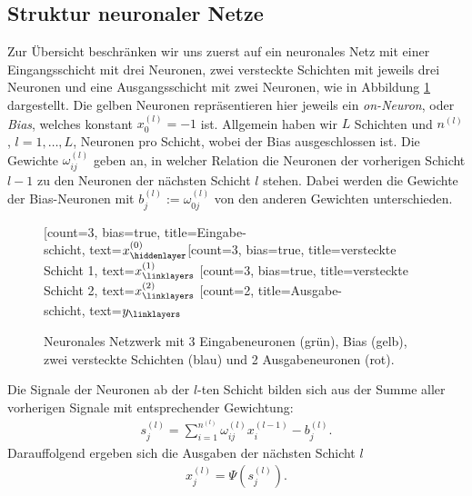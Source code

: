 \subsection{Struktur neuronaler Netze}
\label{subsec:struktur-eines-neuronalen-netzes}
Zur Übersicht beschränken wir uns zuerst auf ein neuronales Netz mit einer Eingangsschicht mit drei Neuronen, zwei
versteckte Schichten mit jeweils drei Neuronen und eine Ausgangsschicht mit zwei Neuronen, wie in Abbildung
\ref{neuralNetexample} dargestellt. Die gelben Neuronen repräsentieren hier jeweils ein \textit{on-Neuron}, oder
\textit{Bias}, welches konstant $x_0^{(l)} = -1$ ist. Allgemein haben wir $L$ Schichten und $n^{(l)}$, $l=1, \dots, L$,
Neuronen pro Schicht, wobei der Bias ausgeschlossen ist. Die Gewichte $\omega_{ij}^{(l)}$ geben an, in welcher Relation
die Neuronen der vorherigen Schicht $l-1$ zu den Neuronen der nächsten Schicht $l$ stehen. Dabei werden die Gewichte
der Bias-Neuronen mit $b_j^{(l)}:= \omega_{0j}^{(l)}$ von den anderen Gewichten unterschieden.
\begin{figure}[htp]
    \centering
    \begin{neuralnetwork}[height=4]
        \newcommand{\x}[2]{$x^{(0)}_#2$}
        \newcommand{\y}[2]{$y_#2$}
        \newcommand{\hfirst}[2]{\small $x^{(1)}_#2$}
        \newcommand{\hsecond}[2]{\small $x^{(2)}_#2$}
        [count=3, bias=true, title=Eingabe-\\schicht, text=\x]
        \hiddenlayer[count=3, bias=true, title=versteckte\\Schicht 1, text=\hfirst]
        \linklayers
        \hiddenlayer[count=3, bias=true, title=versteckte\\Schicht 2, text=\hsecond]
        \linklayers
        \outputlayer[count=2, title=Ausgabe-\\schicht, text=\y] \linklayers
    \end{neuralnetwork}
    \caption{Neuronales Netzwerk mit 3 Eingabeneuronen (grün), Bias (gelb), zwei versteckte Schichten
        (blau) und 2 Ausgabeneuronen (rot).}
    \label{neuralNetexample}
\end{figure}
Die Signale der Neuronen ab der $l$-ten Schicht bilden sich aus der Summe aller vorherigen
Signale mit entsprechender Gewichtung:
\begin{align}
    s_j^{(l)} = \sum_{i=1}^{n^{(l)}} \omega_{ij}^{(l)} x_i^{(l-1)} - b_j^{(l)}. \label{eq:signal}
\end{align}
Darauffolgend ergeben sich die Ausgaben der nächsten Schicht $l$
\begin{align}
    x_j^{(l)}=\Psi(s_j^{(l)}). \label{eq:activ}
\end{align}
